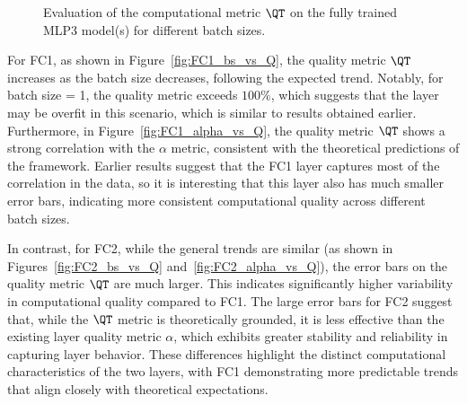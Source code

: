 \begin{figure}[t]
{        \label{fig:FC2_bs_vs_Q}
    }
    \hspace{1cm} %
    \caption{
      Evaluation of the computational \RTransform \LayerQualitySquared metric $\QT$
      on the fully trained MLP3 model(s) for different batch sizes.
    }
    \label{fig:MLP3_qualities}
\end{figure}


For FC1, as shown in Figure~\ref{fig:FC1_bs_vs_Q}, the quality metric \(\QT\) increases as the batch size decreases, following the expected trend. Notably, for batch size = 1, the quality metric exceeds $100\%$,
which suggests that the layer may be overfit in this scenario, which is similar to results obtained earlier. Furthermore, in Figure~\ref{fig:FC1_alpha_vs_Q}, the quality metric \(\QT\) shows a strong correlation with the $\alpha$ metric, consistent with the theoretical predictions of the \HTSR framework.
Earlier results suggest that the FC1 layer captures most of the correlation in the data,
so it is interesting that this layer also has much smaller error bars, indicating more consistent computational
quality across different batch sizes.

In contrast, for FC2, while the general trends are similar (as shown in Figures~\ref{fig:FC2_bs_vs_Q} and~\ref{fig:FC2_alpha_vs_Q}), the error bars on the quality metric $\QT$ are much larger. This indicates significantly higher variability in computational quality compared to FC1. The large error bars for FC2 suggest that, while the $\QT$ metric is theoretically grounded, it is less effective than the existing \HTSR layer quality metric $\alpha$, which exhibits greater stability and reliability in capturing layer behavior. These differences highlight the distinct computational characteristics of the two layers, with FC1 demonstrating more predictable trends that align closely with theoretical expectations.

